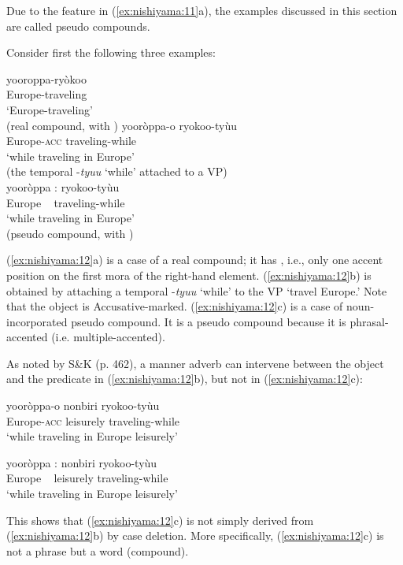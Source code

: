 \documentclass[output=paper]{LSP/langsci}
\begin{document}
Due to the feature in (\ref{ex:nishiyama:11}a), the examples discussed in this section are called pseudo compounds.

  Consider first the following three examples:

\ea\label{ex:nishiyama:12}
 \ea 
 \gll yooroppa-ryòkoo    \\
    Europe-traveling\\
\glt ‘Europe-traveling’\\
\glend (real compound, with )
\largerpage
  \ex  
  \gll yooròppa-o  ryokoo-tyùu  \\  
 Europe-\textsc{acc}  traveling-while\\
\glt ‘while traveling in Europe’\\
\glend (the temporal  -\textit{tyuu} ‘while’ attached to a VP)\\
   
  \ex  
  \gll yooròppa : ryokoo-tyùu   \\
    Europe ~  traveling-while\\
\glt ‘while traveling in Europe’\\
\glend (pseudo compound, with )
\z \z

(\ref{ex:nishiyama:12}a) is a case of a real compound; it has , i.e., only one accent position on the first mora of the right-hand element. (\ref{ex:nishiyama:12}b) is obtained by attaching a temporal  -\textit{tyuu} ‘while’ to the VP ‘travel Europe.’ Note that the object is Accusative-marked. (\ref{ex:nishiyama:12}c) is a case of noun-incorporated pseudo compound. It is a pseudo compound because it is phrasal-accented (i.e. multiple-accented).

  As noted by S\&K (p. 462), a manner adverb can intervene between the object and the predicate in (\ref{ex:nishiyama:12}b), but not in (\ref{ex:nishiyama:12}c):

\ea\label{ex:nishiyama:13}
 \ea  
 \gll yooròppa-o  nonbiri   ryokoo-tyùu\\
    Europe-\textsc{acc}  leisurely  traveling-while\\

\glt ‘while traveling in Europe leisurely’

  \ex  
  \gll *yooròppa : nonbiri  ryokoo-tyùu\\
     Europe  ~ leisurely  traveling-while\\
\glt ‘while traveling in Europe leisurely’
\z \z

This shows that (\ref{ex:nishiyama:12}c) is not simply derived from (\ref{ex:nishiyama:12}b) by case deletion. More specifically, (\ref{ex:nishiyama:12}c) is not a phrase but a word (compound).
\end{document}
